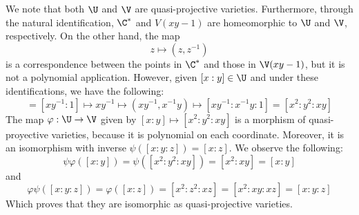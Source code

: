 \documentclass{article}
\begin{document}
\begin{enumerate}
    \vspace{1mm}
    We note that both $\U$ and $\V$ are quasi-projective varieties. Furthermore, through the 
    natural identification, $\C^{*}$ and $V(xy-1)$ are homeomorphic to $\U$ and $\V$, 
    respectively. On the other hand, the map
    \begin{equation*}
        z\mapsto(z,z^{-1})
    \end{equation*}
    is a correspondence between the points in $\C^{*}$ and those in $\V(xy-1)$, but it is not a 
    polynomial application. However, given $[x:y]\in\U$ and under these identifications, we have
    the following:
    \begin{equation*}
        [x:y]=[xy^{-1}:1]\mapsto xy^{-1}\mapsto(xy^{-1},x^{-1}y)\mapsto [xy^{-1}:x^{-1}y:1]
        =[x^{2}:y^{2}:xy]
    \end{equation*}
    The map $\varphi:\U\to\V$ given by $[x:y]\mapsto[x^{2}:y^{2}:xy]$ is a morphism of quasi-
    proyective varieties, because it is polynomial on each coordinate. Moreover, it is an 
    isomorphism with inverse $\psi([x:y:z])=[x:z]$. We observe the following:
    \begin{equation*}
        \psi\varphi([x:y])=\psi([x^{2}:y^{2}:xy])=[x^{2}:xy]=[x:y]
    \end{equation*}
    and
    \begin{equation*}
        \varphi\psi([x:y:z])=\varphi([x:z])=[x^{2}:z^{2}:xz]=[x^{2}:xy:xz]=[x:y:z]
    \end{equation*}
    Which proves that they are isomorphic as quasi-projective varieties.
\end{enumerate}
\end{document}
